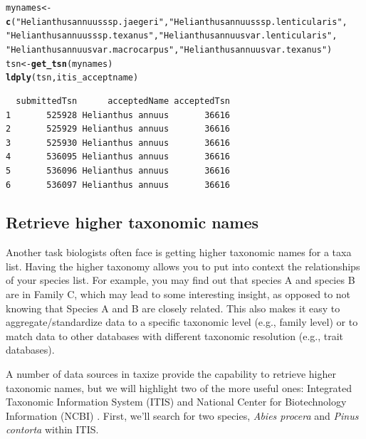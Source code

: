 \documentclass[10pt]{article}\usepackage[]{graphicx}\usepackage[]{color}
\makeatletter
\newcommand{\hlfunctioncall}[1]{\textcolor[rgb]{0.501960784313725,0,0.329411764705882}{\textbf{#1}}}%
\newcommand{\hlstring}[1]{\textcolor[rgb]{0.6,0.6,1}{#1}}%
\newenvironment{kframe}{%
 \def\at@end@of@kframe{}%
 \ifinner\ifhmode%
  \def\at@end@of@kframe{\end{minipage}}%
  \begin{minipage}{\columnwidth}%
 \fi\fi%
 \def\FrameCommand##1{\hskip\@totalleftmargin \hskip-\fboxsep
 \colorbox{shadecolor}{##1}\hskip-\fboxsep
     \hskip-\linewidth \hskip-\@totalleftmargin \hskip\columnwidth}%
 \MakeFramed {\advance\hsize-\width
   \@totalleftmargin\z@ \linewidth\hsize
   \@setminipage}}%
 {\par\unskip\endMakeFramed%
 \at@end@of@kframe}
\newenvironment{knitrout}{}{} %
\makeatother
\begin{document}
\begin{knitrout}
\color{fgcolor}\begin{kframe}
\begin{alltt}
mynames <- \hlfunctioncall{c}(\hlstring{"Helianthus annuus ssp. jaegeri"}, \hlstring{"Helianthus annuus ssp. lenticularis"}, 
    \hlstring{"Helianthus annuus ssp. texanus"}, \hlstring{"Helianthus annuus var. lenticularis"}, 
    \hlstring{"Helianthus annuus var. macrocarpus"}, \hlstring{"Helianthus annuus var. texanus"})
tsn <- \hlfunctioncall{get_tsn}(mynames)
\hlfunctioncall{ldply}(tsn, itis_acceptname)
\end{alltt}
\begin{verbatim}
  submittedTsn      acceptedName acceptedTsn
1       525928 Helianthus annuus       36616
2       525929 Helianthus annuus       36616
3       525930 Helianthus annuus       36616
4       536095 Helianthus annuus       36616
5       536096 Helianthus annuus       36616
6       536097 Helianthus annuus       36616
\end{verbatim}
\end{kframe}
\end{knitrout}


\subsection*{Retrieve higher taxonomic names}
Another task biologists often face is getting higher taxonomic names for a taxa list. Having the higher taxonomy allows you to put into context the relationships of your species list. For example, you may find out that species A and species B are in Family C, which may lead to some interesting insight, as opposed to not knowing that Species A and B are closely related. This also makes it easy to aggregate/standardize data to a specific taxonomic level (e.g., family level) or to match data to other databases with different taxonomic resolution (e.g., trait databases).

A number of data sources in taxize provide the capability to retrieve higher taxonomic names, but we will highlight two of the more useful ones: Integrated Taxonomic Information System (ITIS) \cite{itis} and National Center for Biotechnology Information (NCBI) \cite{federhen}. First, we'll search for two species, \emph{Abies procera} and \emph{Pinus contorta} within ITIS.
\end{document}
